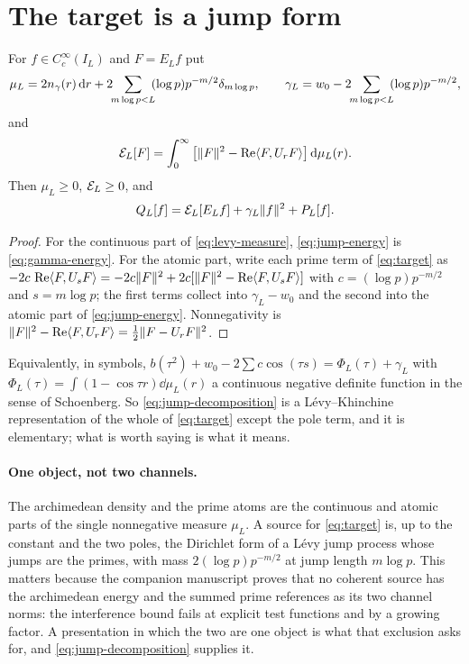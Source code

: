 \section{The target is a jump form}\label{sec:jump}
\begin{proposition}\label{prop:jump}
For $f\in C_c^\infty(I_L)$ and $F=E_Lf$ put
\begin{equation}\label{eq:levy-measure}
 \mu_L=2\gammak(r)\dd r+2\!\!\sum_{m\log p<L}\!\!(\log p)p^{-m/2}\delta_{m\log p},
 \qquad
 \gamma_L=w_0-2\!\!\sum_{m\log p<L}\!\!(\log p)p^{-m/2},
\end{equation}
and
\begin{equation}\label{eq:jump-energy}
 \mathcal E_L[F]=\int_0^\infty\big[\lVert F\rVert^2-\operatorname{Re}\langle F,U_rF\rangle\big]\,\mathrm d\mu_L(r).
\end{equation}
Then $\mu_L\geq0$, $\mathcal E_L\geq0$, and
\begin{equation}\label{eq:jump-decomposition}
 Q_L[f]=\mathcal E_L[E_Lf]+\gamma_L\lVert f\rVert^2+P_L[f].
\end{equation}
\end{proposition}
\begin{proof}
For the continuous part of \eqref{eq:levy-measure}, \eqref{eq:jump-energy} is
\eqref{eq:gamma-energy}. For the atomic part, write each prime term of
\eqref{eq:target} as
$-2c\,\operatorname{Re}\langle F,U_sF\rangle=-2c\lVert F\rVert^2+2c[\lVert F\rVert^2-\operatorname{Re}\langle F,U_sF\rangle]$ with
$c=(\log p)p^{-m/2}$ and $s=m\log p$; the first terms collect into
$\gamma_L-w_0$ and the second into the atomic part of \eqref{eq:jump-energy}.
Nonnegativity is $\lVert F\rVert^2-\operatorname{Re}\langle F,U_rF\rangle=\tfrac12\lVert F-U_rF\rVert^2$.
\end{proof}

Equivalently, in symbols, $b(\tau^2)+w_0-2\sum c\cos(\tau s)=\Phi_L(\tau)+\gamma_L$
with $\Phi_L(\tau)=\int(1-\cos\tau r)\dd\mu_L(r)$ a continuous negative definite
function in the sense of Schoenberg. So \eqref{eq:jump-decomposition} is a
L\'evy--Khinchine representation of the whole of \eqref{eq:target} except the
pole term, and it is elementary; what is worth saying is what it means.

\paragraph{One object, not two channels.} The archimedean density and the prime
atoms are the continuous and atomic parts of the single nonnegative measure
$\mu_L$. A source for \eqref{eq:target} is, up to the constant and the two
poles, the Dirichlet form of a L\'evy jump process whose jumps are the primes,
with mass $2(\log p)p^{-m/2}$ at jump length $m\log p$. This matters because the
companion manuscript proves that no coherent source has the archimedean energy
and the summed prime references as its two channel norms: the interference bound
fails at explicit test functions and by a growing factor. A presentation in
which the two are one object is what that exclusion asks for, and
\eqref{eq:jump-decomposition} supplies it.

